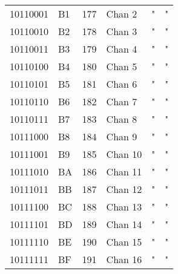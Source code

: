 \begin{center}
\begin{supertabular}{| C{2cm} | C{1.5cm} | C{1.5cm} | C{5.3cm} | C{1.5cm} | C{1.5cm} |}
                10110001 & B1 & 177 & Chan 2   &                   "                    &                    "                        \\
             10110010 & B2 & 178 & Chan 3   &                   "                    &                    "                        \\
                10110011 & B3 & 179 & Chan 4   &                   "                    &                    "                        \\
             10110100 & B4 & 180 & Chan 5   &                   "                    &                    "                        \\
                10110101 & B5 & 181 & Chan 6   &                   "                    &                    "                        \\
             10110110 & B6 & 182 & Chan 7   &                   "                    &                    "                        \\
                10110111 & B7 & 183 & Chan 8   &                   "                    &                    "                        \\
             10111000 & B8 & 184 & Chan 9   &                   "                    &                    "                        \\
                10111001 & B9 & 185 & Chan 10  &                   "                    &                    "                        \\
             10111010 & BA & 186 & Chan 11  &                   "                    &                    "                        \\
                10111011 & BB & 187 & Chan 12  &                   "                    &                    "                        \\
             10111100 & BC & 188 & Chan 13  &                   "                    &                    "                        \\
                10111101 & BD & 189 & Chan 14  &                   "                    &                    "                        \\
             10111110 & BE & 190 & Chan 15  &                   "                    &                    "                        \\
                10111111 & BF & 191 & Chan 16  &                   "                    &                    "                        \\
        \end{supertabular}
        \end{center}

